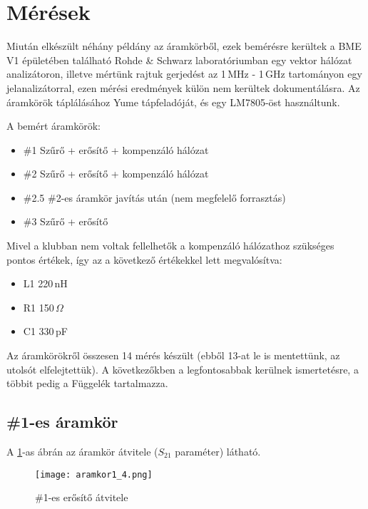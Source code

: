 \section*{Mérések}

Miután elkészült néhány példány az áramkörből, ezek bemérésre kerültek a BME V1 épületében található Rohde \& Schwarz laboratóriumban egy vektor hálózat analizátoron, illetve mértünk rajtuk gerjedést az 1\,MHz - 1\,GHz tartományon egy jelanalizátorral, ezen mérési eredmények külön nem kerültek dokumentálásra. Az áramkörök táplálásához Yume tápfeladóját, és egy LM7805-öst használtunk.

A bemért áramkörök:

\begin{itemize}
	\item \#1 Szűrő + erősítő + kompenzáló hálózat
	\item \#2 Szűrő + erősítő + kompenzáló hálózat
	\item \#2.5 \#2-es áramkör javítás után (nem megfelelő forrasztás)
	\item \#3 Szűrő + erősítő
\end{itemize}

Mivel a klubban nem voltak fellelhetők a kompenzáló hálózathoz szükséges pontos értékek, így az a következő értékekkel lett megvalósítva:

\begin{itemize}
	\item L1 220\,nH
	\item R1 150\,$\Omega$
	\item C1 330\,pF
\end{itemize}

Az áramkörökről összesen 14 mérés készült (ebből 13-at le is mentettünk, az utolsót elfelejtettük). A következőkben a legfontosabbak kerülnek ismertetésre, a többit pedig a Függelék tartalmazza.

\subsection*{\#1-es áramkör}

A \ref{fig:erosito1}-as ábrán az áramkör átvitele ($S_{21}$ paraméter) látható.

\begin{figure}[!ht]
	\centering
	\texttt{[image: aramkor1\_4.png]}
	\caption{\#1-es erősítő átvitele}
	\label{fig:erosito1}
\end{figure}

